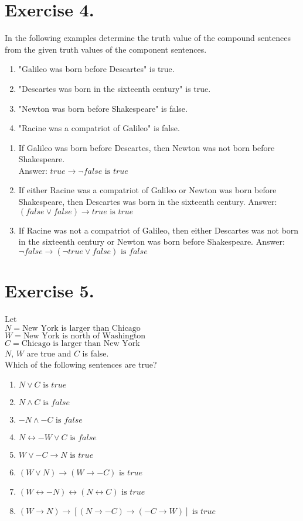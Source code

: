 \documentclass{article}
\begin{document}
\section*{Exercise 4.}
In the following examples determine the truth value of the compound sentences from the given truth values of the component sentences.
\medskip
\begin{enumerate}[label=(\roman*)]
    \item "Galileo was born before Descartes" is true.
    \item "Descartes was born in the sixteenth century" is true.
    \item "Newton was born before Shakespeare" is false.
    \item "Racine was a compatriot of Galileo" is false.
\end{enumerate}
\medskip
\begin{enumerate}[label=(\alph*)]
    \item If Galileo was born before Descartes, then Newton was not born before Shakespeare.\\
        Answer: $true \rightarrow \neg false \text{ is } true$
    \item If either Racine was a compatriot of Galileo or Newton was born before Shakespeare, then Descartes was born in the sixteenth century.
        Answer: $(false \vee false) \rightarrow true \text{ is } true$ 
    \item If Racine was not a compatriot of Galileo, then either Descartes was not born in the sixteenth century or Newton was born before Shakespeare.
        Answer: $\neg false \rightarrow (\neg true \vee false) \text{ is } false$
\end{enumerate}

\section*{Exercise 5.}
Let\\
$N = \text{New York is larger than Chicago}$\\
$W = \text{New York is north of Washington}$\\
$C = \text{Chicago is larger than New York}$\\
$N$, $W$ are true and $C$ is false.\\
Which of the following sentences are true?
\medskip
\begin{enumerate}[label=(\alph*)]
\item $N \vee C \text{ is } true$
\item $N \wedge C \text{ is } false$
\item $-N \wedge -C \text{ is } false$
\item $N \leftrightarrow -W \vee C \text{ is } false$
\item $W \vee -C \rightarrow N \text{ is } true$
\item $(W \vee N) \rightarrow (W \rightarrow -C) \text{ is } true$
\item $(W \leftrightarrow -N) \leftrightarrow (N \leftrightarrow C) \text{ is } true$
\item $(W \rightarrow N) \rightarrow [(N \rightarrow -C) \rightarrow (-C \rightarrow W)] \text{ is } true$
\end{enumerate}
\end{document}
